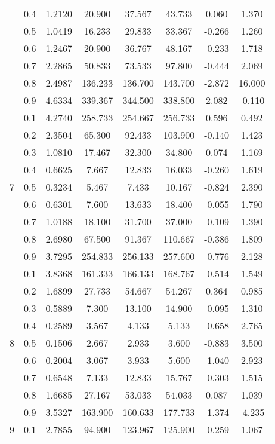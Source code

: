\documentclass[11pt,a4paper]{report}
\begin{document}
\begin{longtable}{ | c | c || c | c | c | c | c | c | }
 & 0.4 & 1.2120 & 20.900 & 37.567 & 43.733 & 0.060 & 1.370 \\
 & 0.5 & 1.0419 & 16.233 & 29.833 & 33.367 & -0.266 & 1.260 \\
 & 0.6 & 1.2467 & 20.900 & 36.767 & 48.167 & -0.233 & 1.718 \\
 & 0.7 & 2.2865 & 50.833 & 73.533 & 97.800 & -0.444 & 2.069 \\
 & 0.8 & 2.4987 & 136.233 & 136.700 & 143.700 & -2.872 & 16.000 \\
 & 0.9 & 4.6334 & 339.367 & 344.500 & 338.800 & 2.082 & -0.110 \\
 \hline
\multirow{9}{*}{7} & 0.1 & 4.2740 & 258.733 & 254.667 & 256.733 & 0.596 & 0.492 \\
 & 0.2 & 2.3504 & 65.300 & 92.433 & 103.900 & -0.140 & 1.423 \\
 & 0.3 & 1.0810 & 17.467 & 32.300 & 34.800 & 0.074 & 1.169 \\
 & 0.4 & 0.6625 & 7.667 & 12.833 & 16.033 & -0.260 & 1.619 \\
 & 0.5 & 0.3234 & 5.467 & 7.433 & 10.167 & -0.824 & 2.390 \\
 & 0.6 & 0.6301 & 7.600 & 13.633 & 18.400 & -0.055 & 1.790 \\
 & 0.7 & 1.0188 & 18.100 & 31.700 & 37.000 & -0.109 & 1.390 \\
 & 0.8 & 2.6980 & 67.500 & 91.367 & 110.667 & -0.386 & 1.809 \\
 & 0.9 & 3.7295 & 254.833 & 256.133 & 257.600 & -0.776 & 2.128 \\
 \hline
\multirow{9}{*}{8} & 0.1 & 3.8368 & 161.333 & 166.133 & 168.767 & -0.514 & 1.549 \\
 & 0.2 & 1.6899 & 27.733 & 54.667 & 54.267 & 0.364 & 0.985 \\
 & 0.3 & 0.5889 & 7.300 & 13.100 & 14.900 & -0.095 & 1.310 \\
 & 0.4 & 0.2589 & 3.567 & 4.133 & 5.133 & -0.658 & 2.765 \\
 & 0.5 & 0.1506 & 2.667 & 2.933 & 3.600 & -0.883 & 3.500 \\
 & 0.6 & 0.2004 & 3.067 & 3.933 & 5.600 & -1.040 & 2.923 \\
 & 0.7 & 0.6548 & 7.133 & 12.833 & 15.767 & -0.303 & 1.515 \\
 & 0.8 & 1.6685 & 27.167 & 53.033 & 54.033 & 0.087 & 1.039 \\
 & 0.9 & 3.5327 & 163.900 & 160.633 & 177.733 & -1.374 & -4.235 \\
 \hline
\multirow{9}{*}{9} & 0.1 & 2.7855 & 94.900 & 123.967 & 125.900 & -0.259 & 1.067 \\

\end{longtable}
\end{document}
